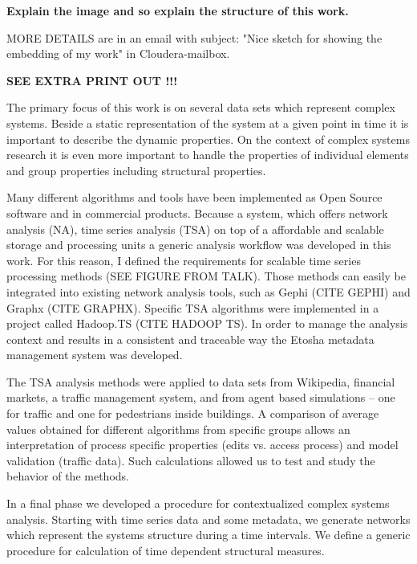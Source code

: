 \documentclass[a4paper,10pt]{scrbook}
\begin{document}
\textbf{Explain the image and so explain the structure of this work.}

MORE DETAILS are in an email with subject: "Nice sketch for showing the embedding of my work" in Cloudera-mailbox.

\textbf{SEE EXTRA PRINT OUT !!!}




The primary focus of this work is on several data sets which represent complex systems. Beside a static representation of the system at a given point in time it is important to describe the dynamic properties. On the context of complex systems research it is even more important to handle the properties of individual elements and group properties including structural properties.



Many different algorithms and tools have been implemented as Open Source software and in commercial products. Because a system, which offers network analysis (NA), time series analysis (TSA) on top of a affordable and scalable storage and processing units a generic analysis workflow was developed in this work. For this reason, I defined the requirements for scalable time series processing methods (SEE FIGURE FROM TALK). Those methods can easily be integrated into existing network analysis tools, such as Gephi (CITE GEPHI) and Graphx (CITE GRAPHX). Specific TSA algorithms were implemented in a project called Hadoop.TS (CITE HADOOP TS).
In order to manage the analysis context and results in a consistent and traceable way the Etosha metadata management system was developed.

The TSA analysis methods were applied to data sets from Wikipedia, financial markets, a traffic management system, and from agent based simulations – one for traffic and one for pedestrians inside buildings. A comparison of average values obtained for different algorithms from specific groups allows an interpretation of process specific properties (edits vs. access process) and model validation (traffic data). Such calculations allowed us to test and study the behavior of the methods.

In a final phase we developed a procedure for contextualized complex systems analysis. Starting with time series data and some metadata, we generate networks which represent the systems structure during a time intervals. We define a generic procedure for calculation of time dependent structural measures. 
\end{document}
